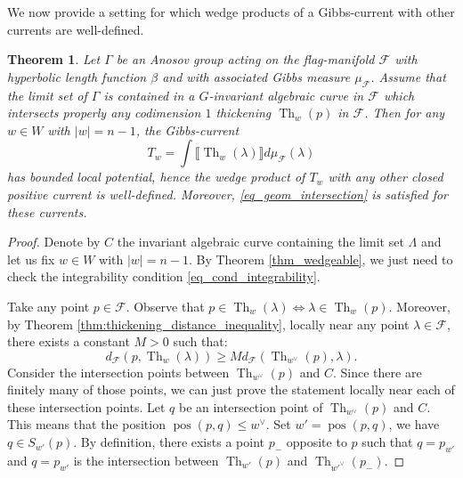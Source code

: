 \documentclass[12pt]{amsbook}%
\newtheorem{thm}{Theorem}[chapter]
\theoremstyle{definition}
\theoremstyle{remark}
\numberwithin{section}{chapter}
\numberwithin{subsection}{section}
\numberwithin{figure}{chapter}
\DeclareMathOperator{\Th}{Th}
\DeclareMathOperator{\pos}{pos}
\newcommand\bac[1]{{\color{blue} #1} }
\newcommand\intcur[1]{\llbracket #1 \rrbracket}
\def\cF{{\mathscr{F}}}
\def\Ga{\Gamma}
\begin{document}
{{%


We now provide a setting for which  wedge products of a Gibbs-current with other currents are well-defined. 

\begin{thm} \label{thm_bounded_potential_curve} Let $\Gamma$ be an Anosov group acting on the flag-manifold $\cF$ with hyperbolic 
length function $\beta$ and with associated Gibbs measure $\mu_{\cF}$. Assume that the limit set of $\Ga$ is contained in a $G$-invariant algebraic curve in $\cF$ which intersects properly any codimension $1$ thickening $\Th_w(p)$ in $\cF$. Then for any $w\in W$ with $|w|= n-1$, the Gibbs-current
\begin{equation*}
T_w = \int \intcur{\Th_w(\lambda)} d\mu_{\cF}(\lambda)
\end{equation*}
has bounded local potential, hence the wedge product of $T_w$ with any other closed positive current is well-defined. 
Moreover, \eqref{eq_geom_intersection} is satisfied for these currents.
\end{thm}

\begin{proof} Denote by $C$ the invariant algebraic curve containing the limit set $\Lambda$ and let us fix $w \in W$ with $|w|=n-1$. By Theorem \ref{thm_wedgeable}, we just need to check the integrability condition \eqref{eq_cond_integrability}.

 
Take any point $ p \in \cF$. Observe that $ p \in \Th_w(\lambda) \Leftrightarrow \lambda \in \Th_w(p)$. Moreover, by Theorem \ref{thm:thickening_distance_inequality}, locally near any point $\lambda \in \cF$, there exists a constant $M>0$ such that: 
\begin{equation} \label{eq_distance_thick}
 d_{\cF}(p, \Th_w(\lambda)) \geqslant M d_{\cF}(\Th_{w^\vee}(p), \lambda).  
\end{equation}
Consider the intersection points between $\Th_{w^\vee}(p)$ and $C$. Since there are finitely many of those points, we can just  prove the statement locally near each of these intersection points. 
 Let $q$ be an intersection point of $\Th_{w^\vee}(p) $ and $C$. 
This means that the position $\pos(p,q) \leqslant w^\vee$. Set $w' = \pos(p,q)$, we have $q \in S_{w'}(p)$. By definition, there exists a point $p_-$ opposite to $p$ such that $q = p_{w'}$ and $q = p_{w'}$ is the intersection between $\Th_{w'}(p)$ and $\Th_{w'^\vee}(p_-)$.   




\end{proof}}}
\end{document}

